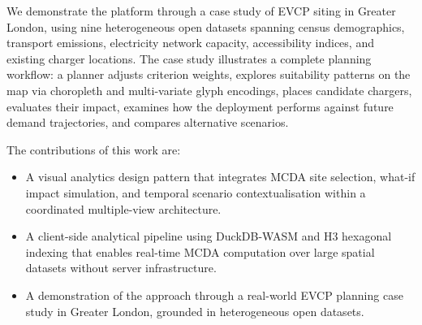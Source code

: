 We demonstrate the platform through a case study of EVCP siting in Greater London, using nine heterogeneous open datasets spanning census demographics, transport emissions, electricity network capacity, accessibility indices, and existing charger locations. The case study illustrates a complete planning workflow: a planner adjusts criterion weights, explores suitability patterns on the map via choropleth and multi-variate glyph encodings, places candidate chargers, evaluates their impact, examines how the deployment performs against future demand trajectories, and compares alternative scenarios.

The contributions of this work are:

\begin{itemize}[nosep]
    \item A visual analytics design pattern that integrates MCDA site selection, what-if impact simulation, and temporal scenario contextualisation within a coordinated multiple-view architecture.
    \item A client-side analytical pipeline using DuckDB-WASM and H3 hexagonal indexing that enables real-time MCDA computation over large spatial datasets without server infrastructure.
    \item A demonstration of the approach through a real-world EVCP planning case study in Greater London, grounded in heterogeneous open datasets.
\end{itemize}
